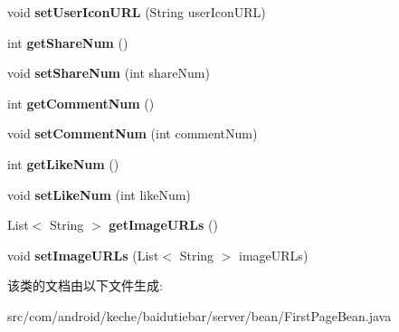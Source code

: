 \begin{DoxyCompactItemize}
void {\bfseries set\+User\+Icon\+U\+RL} (String user\+Icon\+U\+RL)
\item 
\mbox{\label{classcom_1_1android_1_1keche_1_1baidutiebar_1_1server_1_1bean_1_1_first_page_bean_a2fb6f3494696c235c22c6fe66e00d605}} 
int {\bfseries get\+Share\+Num} ()
\item 
\mbox{\label{classcom_1_1android_1_1keche_1_1baidutiebar_1_1server_1_1bean_1_1_first_page_bean_a6f1e2244a303c30436ba23ee183493f4}} 
void {\bfseries set\+Share\+Num} (int share\+Num)
\item 
\mbox{\label{classcom_1_1android_1_1keche_1_1baidutiebar_1_1server_1_1bean_1_1_first_page_bean_ad8f238e8b0e8e754438d86d600cdbb39}} 
int {\bfseries get\+Comment\+Num} ()
\item 
\mbox{\label{classcom_1_1android_1_1keche_1_1baidutiebar_1_1server_1_1bean_1_1_first_page_bean_a2a951091adf7bb212cf38f9e5e0af321}} 
void {\bfseries set\+Comment\+Num} (int comment\+Num)
\item 
\mbox{\label{classcom_1_1android_1_1keche_1_1baidutiebar_1_1server_1_1bean_1_1_first_page_bean_aba0d13a3531f67ff09ea038e2647e422}} 
int {\bfseries get\+Like\+Num} ()
\item 
\mbox{\label{classcom_1_1android_1_1keche_1_1baidutiebar_1_1server_1_1bean_1_1_first_page_bean_a930780c5d1818d394d8208902d65c5a6}} 
void {\bfseries set\+Like\+Num} (int like\+Num)
\item 
\mbox{\label{classcom_1_1android_1_1keche_1_1baidutiebar_1_1server_1_1bean_1_1_first_page_bean_a111249a7233a8545149b605515548b37}} 
List$<$ String $>$ {\bfseries get\+Image\+U\+R\+Ls} ()
\item 
\mbox{\label{classcom_1_1android_1_1keche_1_1baidutiebar_1_1server_1_1bean_1_1_first_page_bean_a16d9628fa7ca7cac5139de7a61740742}} 
void {\bfseries set\+Image\+U\+R\+Ls} (List$<$ String $>$ image\+U\+R\+Ls)
\end{DoxyCompactItemize}


该类的文档由以下文件生成\+:\begin{DoxyCompactItemize}
\item 
src/com/android/keche/baidutiebar/server/bean/First\+Page\+Bean.\+java\end{DoxyCompactItemize}
